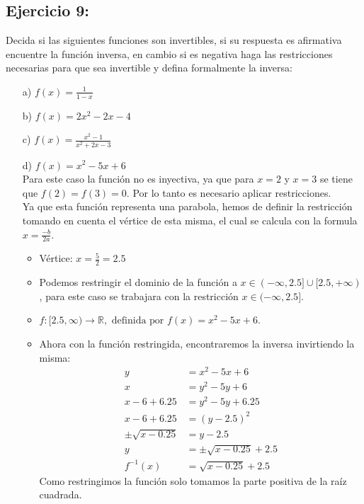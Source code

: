 \documentclass{templateNote}
\begin{document}
\subsection*{\textbf{Ejercicio 9:}}
Decida si las siguientes funciones son invertibles, si su respuesta es afirmativa
encuentre la función inversa, en cambio si es negativa haga las restricciones necesarias para
que sea invertible y defina formalmente la inversa:
\begin{itemize}
    \item[a)] $f(x) = \frac{1}{1 - x}$
    \item[b)] $f(x) = 2x^2 - 2x - 4$
    \item[c)] $f(x) = \frac{x^2 - 1}{x^2 + 2x - 3}$
    \item[d)] $f(x) = x^2 - 5x + 6$ 
    \\
    Para este caso la función no es inyectiva, ya que para $x = 2$ y $x = 3$ se tiene que $f(2) = f(3) = 0$. Por lo tanto es necesario aplicar restricciones.\\
    Ya que esta función representa una parabola, hemos de definir la restricción tomando en cuenta el vértice de esta misma, el cual se calcula con la formula $x = \frac{-b}{2a}$.
    \begin{itemize}
        \item Vértice: $x = \frac{5}{2} = 2.5$
        \item Podemos restringir el dominio de la función a $x \in (-\infty, 2.5] \cup [2.5, +\infty)$, para este caso se trabajara con la restricción $x \in (-\infty, 2.5]$.
        \item $f: [2.5, \infty) \rightarrow \mathbb{R}, \text{ definida por } f(x) = x^2 - 5x + 6$.
        \item Ahora con la función restringida, encontraremos la inversa invirtiendo la misma:
        \begin{align*}
            y &= x^2 - 5x + 6 \\
            x &= y^2 - 5y + 6 \\
            x - 6 + 6.25 &= y^2 - 5y + 6.25 \\
            x - 6 + 6.25 &= (y - 2.5)^2 \\
            \pm\sqrt{x - 0.25} &= y - 2.5 \\
            y &= \pm \sqrt{x - 0.25} + 2.5 \\
            f^{-1}(x) &= \sqrt{x - 0.25} + 2.5
        \end{align*}
        Como restringimos la función solo tomamos la parte positiva de la raíz cuadrada.

\end{itemize}
\end{itemize}
\end{document}
